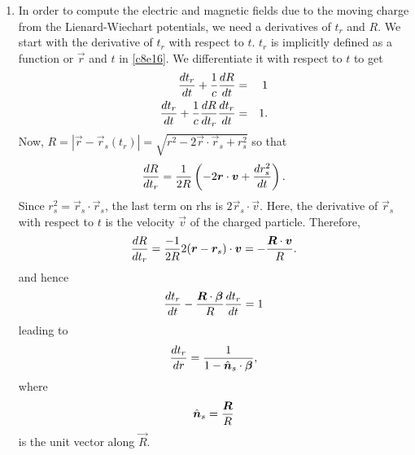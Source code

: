 \begin{enumerate}
\item In order to compute the electric and magnetic fields due to the moving
charge from the Lienard-Wiechart potentials, we need a derivatives of $t_r$ and
$R$. We start with the derivative of $t_r$ with respect to $t$. $t_r$ is 
implicitly defined as a function or $\vec{r}$ and $t$ in \eqref{c8e16}. We
differentiate it with respect to $t$ to get
\begin{eqnarray*}
\frac{d{t_r}}{d{t}} + \frac{1}{c}\frac{d{R}}{d{t}} &=& 1 \\
\frac{d{t_r}}{d{t}} + \frac{1}{c}\frac{d{R}}{d{t_r}}\frac{d{t_r}}{d{t}} &=& 1.
\end{eqnarray*}
Now, $R = |\vec{r} - \vec{r}_s(t_r)| = \sqrt{r^2-2\vec{r}\cdot\vec{r}_s+r_s^2}$
so that
\[
\frac{d{R}}{d{t_r}} = \frac{1}{2R}\left(-2\bm{r}\cdot\bm{v} + \frac{d{r_s^2}}{d{t}}\right).
\]
Since $r_s^2 = \vec{r}_s\cdot\vec{r}_s$, the last term on rhs is $2\vec{r}_s
\cdot\vec{v}$. Here, the derivative of $\vec{r}_s$ with respect to $t$ is the
velocity $\vec{v}$ of the charged particle. Therefore,
\[
\frac{d{R}}{d{t_r}} = \frac{-1}{2R}2(\bm{r} - \bm{r}_s)\cdot\bm{v} = 
-\frac{\bm{R}\cdot\bm{v}}{R}.
\]
and hence
\[
\frac{d{t_r}}{d{t}} - \frac{\bm{R}\cdot\bm{\beta}}{R}\frac{d{t_r}}{d{t}} = 1
\]
leading to
\begin{equation}\label{c8e25}
\frac{d{t_r}}{d{r}} = \frac{1}{1 - \hat{\bm{n}}_s\cdot\bm{\beta}},
\end{equation}
where
\begin{equation}\label{c8e26}
\hat{\bm{n}}_s = \frac{\bm{R}}{R}
\end{equation}
is the unit vector along $\vec{R}$.


\end{enumerate}
